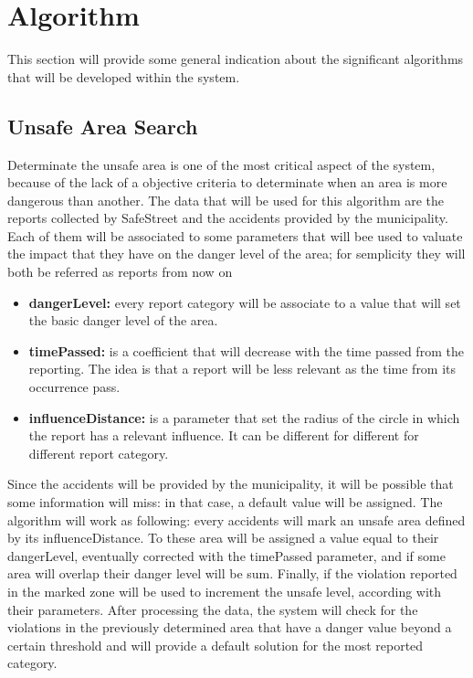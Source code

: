 \documentclass[../RASD.tex]{subfiles}
\begin{document}
    \newpage
    \section{Algorithm}\label{sec:algorithm}
    This section will provide some general indication about the significant algorithms that will be developed within the system.
    \subsection{Unsafe Area Search}\label{subsec:unsafe-area-search}
    Determinate the unsafe area is one of the most critical aspect of the system, because of the lack of a objective criteria to determinate when an area is more dangerous than another.
    The data that will be used for this algorithm are the reports collected by SafeStreet and the accidents provided by the municipality.
    Each of them will be associated to some parameters that will bee used to valuate the impact that they have on the danger level of the area; for semplicity they will both be referred as reports from now on
    \begin{itemize}
        \item \textbf{dangerLevel:} every report category will be associate to a value that will set the basic danger level of the area.
        \item \textbf{timePassed:} is a coefficient that will decrease with the time passed from the reporting. The idea is that a report will be less relevant as the time from its occurrence pass.
        \item \textbf{influenceDistance:} is a parameter that set the radius of the circle in which the report has a relevant influence. It can be different for different for different report category.
    \end{itemize}
    Since the accidents will be provided by the municipality, it will be possible that some information will miss: in that case, a default value will be assigned.
    The algorithm will work as following: every accidents will mark an unsafe area defined by its influenceDistance.
    To these area will be assigned a value equal to their dangerLevel, eventually corrected with the timePassed parameter, and if some area will overlap their danger level will be sum.
    Finally, if the violation reported in the marked zone will be used to increment the unsafe level, according with their parameters.
    After processing the data, the system will check for the violations in the previously determined area that have a danger value beyond a certain threshold and will provide a default solution for the most reported category.
\end{document}
